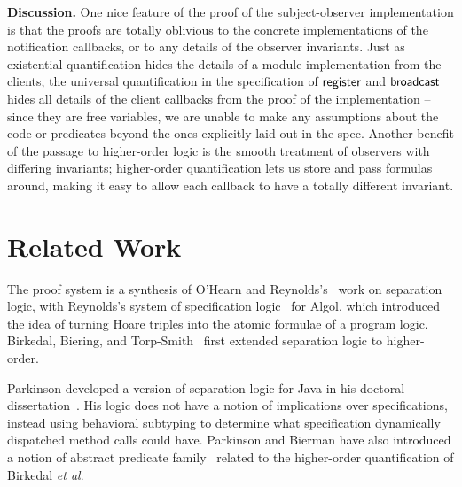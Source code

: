 \documentclass[preprint,natbib]{sigplanconf}
\begin{document}
\textbf{Discussion.} One nice feature of the proof of the
subject-observer implementation is that the proofs are totally
oblivious to the concrete implementations of the notification
callbacks, or to any details of the observer invariants. Just as
existential quantification hides the details of a module
implementation from the clients, the universal quantification in the
specification of $\mbox{\textsf{{register}}}$ and $\mbox{\textsf{{broadcast}}}$ hides all
details of the client callbacks from the proof of the implementation
-- since they are free variables, we are unable to make any
assumptions about the code or predicates beyond the ones explicitly
laid out in the spec. Another benefit of the passage to higher-order
logic is the smooth treatment of observers with differing invariants;
higher-order quantification lets us store and pass formulas around,
making it easy to allow each callback to have a totally different
invariant. 




\section{Related Work}
The proof system is a synthesis of O'Hearn and
Reynolds's~\cite{sep-logic} work on separation logic, with Reynolds's
system of specification logic~\cite{spec-logic} for Algol, which
introduced the idea of turning Hoare triples into the atomic formulae
of a program logic. Birkedal, Biering, and Torp-Smith~\cite{hosl}
first extended separation logic to higher-order.

Parkinson developed a version of separation logic for Java in his
doctoral dissertation~\cite{parkinson-thesis}. His logic does not have
a notion of implications over specifications, instead using behavioral
subtyping to determine what specification dynamically dispatched
method calls could have. Parkinson and Bierman have also introduced a
notion of abstract predicate family~\cite{parkinson-bierman-05}
related to the higher-order quantification of Birkedal \emph{et al}.

\end{document}
